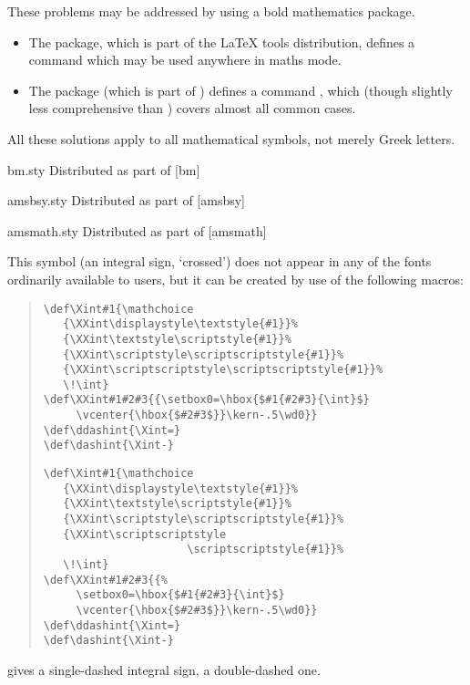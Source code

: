 These problems may be addressed by using a bold mathematics package.
\begin{itemize}
\item The  package, which is part of the \LaTeX{} tools
  distribution, defines a command  which may be used anywhere
  in maths mode.
\item The  package (which is part of \AMSLaTeX{})
  defines a command , which (though slightly less
  comprehensive than ) covers almost all common cases.
\end{itemize}

All these solutions apply to all mathematical symbols, not merely
Greek letters.
\begin{ctanrefs}
\item[bm.sty]Distributed as part of [bm]
\item[amsbsy.sty]Distributed as part of \AMSLaTeX{} [amsbsy]
\item[amsmath.sty]Distributed as part of \AMSLaTeX{}
  [amsmath]
\end{ctanrefs}


This symbol (an integral sign, `crossed') does not appear in any of
the fonts ordinarily available to \AllTeX{} users, but it can be
created by use of the following macros:
\begin{quote}
\begin{wideversion}
\begin{verbatim}
\def\Xint#1{\mathchoice
   {\XXint\displaystyle\textstyle{#1}}%
   {\XXint\textstyle\scriptstyle{#1}}%
   {\XXint\scriptstyle\scriptscriptstyle{#1}}%
   {\XXint\scriptscriptstyle\scriptscriptstyle{#1}}%
   \!\int}
\def\XXint#1#2#3{{\setbox0=\hbox{$#1{#2#3}{\int}$}
     \vcenter{\hbox{$#2#3$}}\kern-.5\wd0}}
\def\ddashint{\Xint=}
\def\dashint{\Xint-}
\end{verbatim}
\end{wideversion}
\begin{narrowversion}
\begin{verbatim}
\def\Xint#1{\mathchoice
   {\XXint\displaystyle\textstyle{#1}}%
   {\XXint\textstyle\scriptstyle{#1}}%
   {\XXint\scriptstyle\scriptscriptstyle{#1}}%
   {\XXint\scriptscriptstyle
                      \scriptscriptstyle{#1}}%
   \!\int}
\def\XXint#1#2#3{{%
     \setbox0=\hbox{$#1{#2#3}{\int}$}
     \vcenter{\hbox{$#2#3$}}\kern-.5\wd0}}
\def\ddashint{\Xint=}
\def\dashint{\Xint-}
\end{verbatim}
\end{narrowversion}
\end{quote}
 gives a single-dashed integral sign,  a
double-dashed one.

